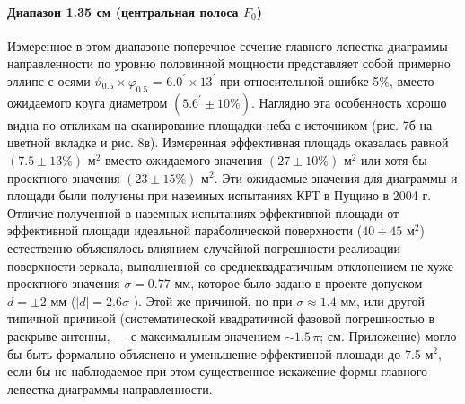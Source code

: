 \paragraph{Диапазон 1.35 см (центральная полоса $F_0$)}

Измеренное в этом диапазоне поперечное сечение главного лепестка диаграммы
направленности по уровню половинной мощности представляет собой примерно
эллипс с осями
$\vartheta_{0.5}\times \varphi_{0.5}$ = $6.0^\prime\times 13^\prime$
при относительной ошибке 5\%,
вместо ожидаемого круга диаметром $(5.6^\prime \pm 10\%)$.
Наглядно эта особенность хорошо видна по откликам на сканирование площадки
неба с источником (рис. 7б на цветной вкладке и рис. 8в).
Измеренная эффективная площадь оказалась равной $(7.5 \pm 13\%)$ м$^2$
вместо ожидаемого значения $(27 \pm 10\%)$ м$^2$ или хотя бы проектного значения
$(23 \pm 15\%)$ м$^2$.
Эти ожидаемые значения для диаграммы и площади были получены при наземных
испытаниях КРТ в Пущино в 2004 г.
Отличие полученной в наземных испытаниях эффективной площади от
эффективной площади идеальной параболической поверхности ($40 \div 45$ м$^2$)
естественно объяснялось влиянием случайной погрешности реализации поверхности
зеркала, выполненной со среднеквадратичным отклонением не хуже проектного
значения $\sigma = 0.77$ мм, которое было задано в проекте допуском
$d = \pm 2$ мм ($\vert d \vert = 2.6 \sigma$   \cite{}).
Этой же причиной, но при $\sigma \approx 1.4$ мм, или другой типичной причиной
(систематической квадратичной фазовой погрешностью в раскрыве антенны, ---
с максимальным значением $\sim 1.5\,\pi$; см. Приложение) могло бы быть
формально объяснено и уменьшение эффективной площади до 7.5 м$^2$,
если бы не наблюдаемое при этом существенное искажение формы главного лепестка
диаграммы направленности.

